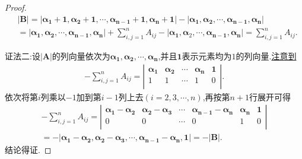\documentclass[../../main.tex]{subfiles}
\begin{document}
\begin{proof}
\begin{align*}
&|\boldsymbol{B}| = |\boldsymbol{\alpha}_{\boldsymbol{1}} + \mathbf{1},\boldsymbol{\alpha}_{\boldsymbol{2}} + \mathbf{1},\cdots,\boldsymbol{\alpha}_{\boldsymbol{n-1}} + \mathbf{1},\boldsymbol{\alpha}_{\boldsymbol{n}} + \mathbf{1}| - |\boldsymbol{\alpha}_{\boldsymbol{1}},\boldsymbol{\alpha}_{\boldsymbol{2}},\cdots,\boldsymbol{\alpha}_{\boldsymbol{n-1}},\boldsymbol{\alpha}_{\boldsymbol{n}}|
\\
&= |\boldsymbol{\alpha}_{\boldsymbol{1}},\boldsymbol{\alpha}_{\boldsymbol{2}},\cdots,\boldsymbol{\alpha}_{\boldsymbol{n-1}},\boldsymbol{\alpha}_{\boldsymbol{n}}| + \sum_{i,j = 1}^{n}A_{ij} - |\boldsymbol{\alpha}_{\boldsymbol{1}},\boldsymbol{\alpha}_2,\cdots,\boldsymbol{\alpha}_{\boldsymbol{n-1}},\boldsymbol{\alpha}_{\boldsymbol{n}}| = \sum_{i,j = 1}^{n}A_{ij}.
\end{align*}

{\color{blue}证法二:}设\(|\boldsymbol{A}|\)的列向量依次为\(\boldsymbol{\alpha}_{\boldsymbol{1}},\boldsymbol{\alpha}_{\boldsymbol{2}},\cdots,\boldsymbol{\alpha}_{\boldsymbol{n}}\),并且\(\mathbf{1}\)表示元素均为\(1\)的列向量.\hyperref[关于行列式|A|所有代数余子式求和的构造]{注意到}
\begin{align*}
-\sum_{i,j=1}^n{A_{ij}}=\left| \begin{matrix}
\boldsymbol{\alpha }_{\mathbf{1}}&		\boldsymbol{\alpha }_{\mathbf{2}}&		\cdots&		\boldsymbol{\alpha }_{\boldsymbol{n}}&		\mathbf{1}\\
1&		1&		\cdots&		1&		0\\
\end{matrix} \right|.
\end{align*}
依次将第$i$列乘以$-1$加到第$i-1$列上去$(i=2,3,\cdots,n)$,再按第$n+1$行展开可得
\begin{align*}
-\sum_{i,j=1}^n{A_{ij}=\left| \begin{matrix}
\boldsymbol{\alpha }_{\mathbf{1}}-\boldsymbol{\alpha }_{\mathbf{2}}&		\boldsymbol{\alpha }_{\mathbf{2}}-\boldsymbol{\alpha }_{\mathbf{3}}&		\cdots&		\boldsymbol{\alpha }_{\boldsymbol{n}-\mathbf{1}}-\boldsymbol{\alpha }_{\boldsymbol{n}}&		\boldsymbol{\alpha }_{\boldsymbol{n}}&		\mathbf{1}\\
0&		0&		\cdots&		0&		1&		0\\
\end{matrix} \right|}
\\
=-|\boldsymbol{\alpha }_{\mathbf{1}}-\boldsymbol{\alpha }_{\mathbf{2}},\boldsymbol{\alpha }_{\mathbf{2}}-\boldsymbol{\alpha }_{\mathbf{3}},\cdots ,\boldsymbol{\alpha }_{\boldsymbol{n}-\mathbf{1}}-\boldsymbol{\alpha }_{\boldsymbol{n}},\mathbf{1}|=-|\boldsymbol{B}|.
\end{align*}
结论得证.
\end{proof}
\end{document}
